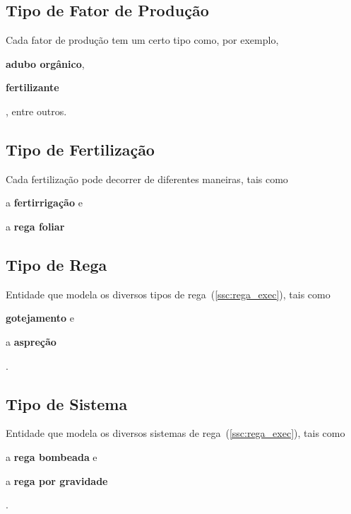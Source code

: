 \documentclass[12pt, a4paper]{article}
\begin{document}

\subsection{Tipo de Fator de Produ\c{c}\~ao}\label{ssc:tipo_fator_prod}

Cada fator de produ\c{c}\~ao tem um certo tipo como, por exemplo,
\begin{enumerate*}[label = (\roman*)]
    \item \textbf{adubo org\^anico},
    \item \textbf{fertilizante}
\end{enumerate*}, entre outros.


\subsection{Tipo de Fertiliza\c{c}\~ao}\label{ssc:tipo_fert}

Cada fertiliza\c{c}\~ao pode decorrer de diferentes maneiras, tais como
\begin{enumerate*}[label = (\roman*)]
    \item a \textbf{fertirriga\c{c}\~ao}
        e
    \item a \textbf{rega foliar}
\end{enumerate*}


\subsection{Tipo de Rega}\label{ssc:tipo_rega}

Entidade que modela os diversos tipos de rega~(\ref{ssc:rega_exec}), tais como
\begin{enumerate*}[label = (\roman*)]
    \item \textbf{gotejamento}
        e
    \item a \textbf{aspre\c{c}\~ao}
\end{enumerate*}.


\subsection{Tipo de Sistema}\label{ssc:tipo_sys}

Entidade que modela os diversos sistemas de rega~(\ref{ssc:rega_exec}), tais como
\begin{enumerate*}[label = (\roman*)]
    \item a \textbf{rega bombeada}
        e
    \item a \textbf{rega por gravidade}
\end{enumerate*}.
\end{document}
